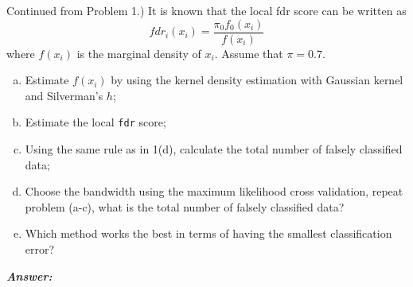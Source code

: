 \documentclass[12pt]{article}
\newenvironment{question}[2][Question]{\begin{trivlist}
\item[\hskip \labelsep {\bfseries #1}\hskip \labelsep {\bfseries #2.}]}{\end{trivlist}}
\begin{document}
\bigskip
\bigskip
 \begin{question}{5.2} (Continued from Problem 1.)  It is known that the local fdr score can be written as 
$$
fdr_i(x_i) = \frac{\pi_0 f_0(x_i)} {f(x_i)}
$$
where $f(x_i)$ is the marginal density of $x_i$. Assume that $\pi = 0.7$.
 \begin{enumerate}[(a)]
\item Estimate $f(x_i)$ by using the kernel density estimation with Gaussian kernel and Silverman's $h$;
\item Estimate the local \texttt{fdr} score;
\item  Using the same rule as in 1(d), calculate the total number of falsely classified data;
\item Choose the bandwidth using the maximum likelihood cross validation, repeat problem (a-c),
what is the total number of falsely classified data?
\item Which method works the best in terms of having the smallest classification error?
\end{enumerate}
\end{question} 


  \textbf{\color{TealBlue}\emph{Answer:} } 
 
\end{document}

